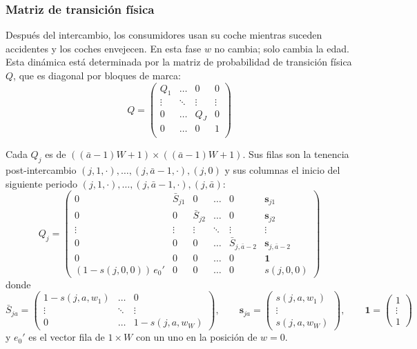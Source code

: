 \documentclass{article}
\begin{document}
\subsubsection{Matriz de transición física}

Después del intercambio, los consumidores usan su coche mientras suceden accidentes y los coches envejecen. En esta fase $w$ no cambia; solo cambia la edad. Esta dinámica está determinada por la matriz de probabilidad de transición física $Q$, que es diagonal por bloques de marca:
$$Q=
\begin{pmatrix}
    Q_1 & \dots & 0 & 0 \\
    \vdots & \ddots& \vdots & \vdots \\
    0 & \dots & Q_J & 0 \\
    0 & \dots & 0 & 1 \\
\end{pmatrix}
$$


Cada $Q_j$ es de $((\bar{a}-1)W+1)\times((\bar{a}-1)W+1)$. Sus filas son la tenencia post-intercambio $(j,1,\cdot),\dots,(j,\bar{a}-1,\cdot),(j,0)$ y sus columnas el inicio del siguiente periodo $(j,1,\cdot),\dots,(j,\bar{a}-1,\cdot),(j,\bar{a})$:
$$
Q_j=\begin{pmatrix}
    0 & \bar{S}_{j1} & 0 & \dots & 0 & \mathbf{s}_{j1} \\
    0 & 0 & \bar{S}_{j2} & \dots & 0 & \mathbf{s}_{j2} \\
    \vdots & \vdots & \vdots & \ddots & \vdots & \vdots \\
    0 & 0 & 0 & \dots & \bar{S}_{j,\bar{a}-2} & \mathbf{s}_{j,\bar{a}-2} \\
    0 & 0 & 0 & \dots & 0 & \mathbf{1} \\
    (1-s(j,0,0))\,e_{0}' & 0 & 0 & \dots & 0 & s(j,0,0)
\end{pmatrix}
$$
donde
$$
\bar{S}_{ja}=\begin{pmatrix}
   1-s(j,a,w_1) & \dots & 0 \\
   \vdots & \ddots & \vdots \\
   0 & \dots & 1-s(j,a,w_W)
\end{pmatrix},
\qquad
\mathbf{s}_{ja}=\begin{pmatrix} s(j,a,w_1)\\ \vdots \\ s(j,a,w_W)\end{pmatrix},
\qquad
\mathbf{1}=\begin{pmatrix} 1\\ \vdots \\ 1\end{pmatrix}
$$
y $e_{0}'$ es el vector fila de $1\times W$ con un uno en la posición de $w=0$.
\end{document}
